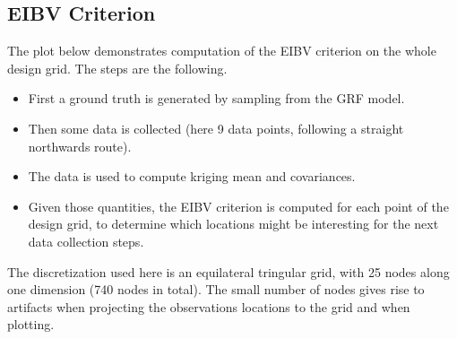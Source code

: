 \documentclass[a4paper,10pt]{article}
\begin{document}
\subsection{EIBV Criterion}
The plot below demonstrates computation of the EIBV criterion on the whole design grid. The steps are the following.
\begin{itemize}
  \item First a ground truth is generated by sampling from the GRF model.
  \item Then some data is collected (here 9 data points, following a straight northwards route).
  \item The data is used to compute kriging mean and covariances.
  \item Given those quantities, the EIBV criterion is computed for each point of the design grid, to determine which locations might be interesting for the next data collection steps.
\end{itemize}

The discretization used here is an equilateral tringular grid, with 25 nodes along one dimension (740 nodes in total). The small number of nodes gives rise to artifacts when projecting the observations locations to the grid and when plotting.
\end{document}
